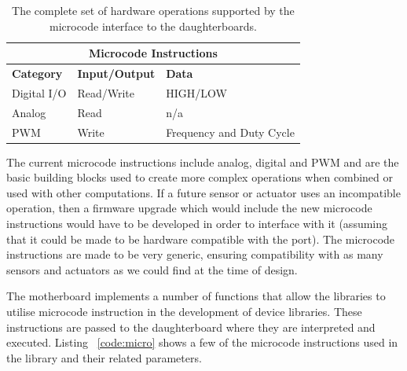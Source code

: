 	\begin{table}[h] 
        \centering
          \scriptsize {%
	      \begin{tabular}{|l|l|l|}
            \toprule
	        \multicolumn{3}{c}{\textbf{Microcode Instructions}} \\\hline
            \textbf{Category} & \textbf{Input/Output} & \textbf{Data}\\\hline
            Digital I/O  & Read/Write & HIGH/LOW \\\hline
            Analog & Read & n/a \\\hline
            PWM & Write & Frequency and Duty Cycle \\\hline
            \end{tabular} 
            }
	  \caption{The complete set of hardware operations supported by the
	    microcode interface to the daughterboards.}%
	  \label{tab:microcode}
	\end{table}
	\normalsize
	
 The current microcode instructions include analog, digital and PWM and are the basic building blocks used to create more complex operations when combined or used with other computations. If a future sensor or actuator uses an incompatible operation, then a firmware upgrade which would include the new microcode instructions would have to be developed in order to interface with it (assuming that it could be made to be hardware compatible with the port). The microcode instructions are made to be very generic, ensuring compatibility with as many sensors and actuators as we could find at the time of design.

	The motherboard implements a number of functions that allow the libraries to utilise microcode instruction in the development of device libraries. These instructions are passed to the daughterboard where they are interpreted and executed. Listing ~\ref{code:micro} shows a few of the microcode instructions used in the \xten library and their related parameters.
	
